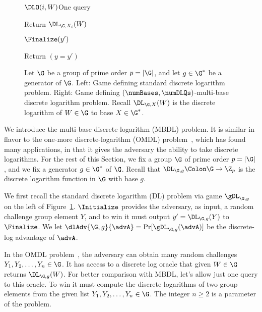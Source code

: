 \begin{figure}[t]
{\begin{oracleC}{$\DLO(i, W)$}{One query}
\item Return $\DL_{\G, X_i}(W)$ 
\end{oracleC}
\ExptSepSpace

\begin{oracle}{$\Finalize(y')$}
\item Return $(y = y')$ \smallskip
\end{oracle}
}
\vspace{-5pt}
\caption{Let $\G$ be a group of prime order $p=|\G|$, and let $g\in\G^*$ be a generator of $\G$. Left: Game defining standard discrete logarithm problem. Right: Game defining $(\numBases,\numDLQs)$-multi-base discrete logarithm problem. Recall $\DL_{\G,X}(W)$ is the discrete logarithm of $W\in\G$ to base $X\in\G^*$.}
\label{fig:mbdl-game}
\hrulefill
\vspace{-10pt}
\end{figure}

We introduce the multi-base discrete-logarithm (MBDL) problem. It is similar in flavor to the one-more discrete-logarithm (OMDL) problem~\cite{JC:BNPS03}, which has found many applications, in that it gives the adversary the ability to take discrete logarithms. For the rest of this Section, we fix a group $\G$ of prime order $p=|\G|$, and we fix a generator $g\in\G^*$ of $\G$. Recall that $\DL_{\G,g}\Colon\G\to\Z_p$ is the discrete logarithm function in $\G$ with base $g$.

 We first recall the standard discrete logarithm (DL) problem via game $\gDL_{\G,g}$ on the left of Figure~\ref{fig:mbdl-game}. $\Initialize$ provides the adversary, as input, a random challenge group element $Y$, and to win it must output $y'=\DL_{\G,g}(Y)$ to $\Finalize$. We let $\dlAdv{\G,g}{\advA} = \Pr[\gDL_{\G,g}(\advA)]$ be the discrete-log advantage of $\advA$.

In the OMDL problem~\cite{JC:BNPS03}, the adversary can obtain many random challenges $Y_1,\allowbreak Y_2,\allowbreak \ldots,\allowbreak Y_n \in\G$. It has access to a discrete log oracle that given $W\in\G$ returns $\DL_{\G,g}(W)$. For better comparison with MBDL, let's allow just one query to this oracle. To win it must compute the discrete logarithms of two group elements from the given list $Y_1,\allowbreak Y_2,\allowbreak \ldots,\allowbreak Y_n \in\G$. The integer $n\geq 2$ is a parameter of the problem.

